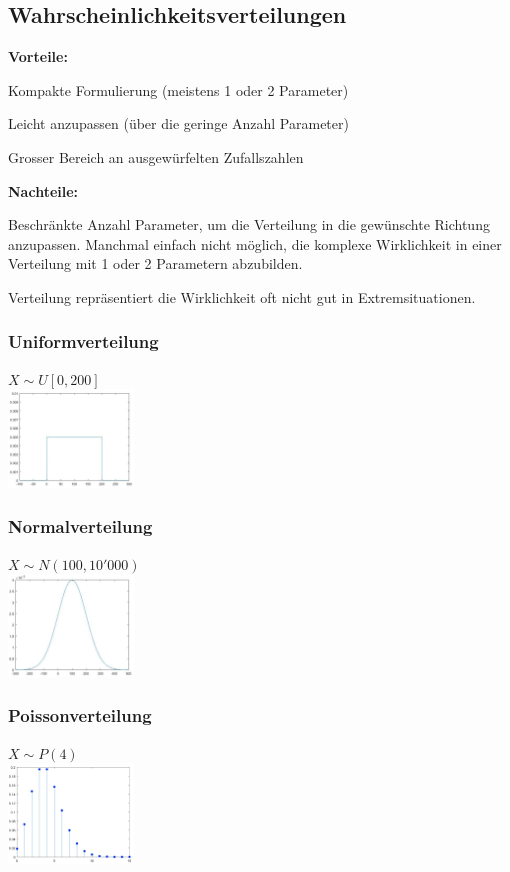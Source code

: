 \subsection{Wahrscheinlichkeitsverteilungen}	
\textbf{Vorteile:} 	
\begin{compactitem}
	\item Kompakte Formulierung (meistens 1 oder 2 Parameter)
	\item Leicht anzupassen (über die geringe Anzahl Parameter)
	\item Grosser Bereich an ausgewürfelten Zufallszahlen
\end{compactitem}	
\textbf{Nachteile:}
\begin{compactitem}
	\item Beschränkte Anzahl Parameter, um die Verteilung in die gewünschte Richtung anzupassen. Manchmal einfach nicht möglich, die komplexe Wirklichkeit in einer Verteilung mit 1 oder 2 Parametern abzubilden.
	\item Verteilung repräsentiert die Wirklichkeit oft nicht gut in Extremsituationen.
\end{compactitem}

\begin{multicols}{3}
	\subsubsection{Uniformverteilung} 
	$X \sim U[0, 200]$ \\
	\includegraphics[width=0.25\textwidth]{pictures/uniformverteilung} 
	\subsubsection{Normalverteilung} 
	$X \sim N(100, 10'000)$ \\
	\includegraphics[width=0.25\textwidth]{pictures/normalverteilung} 
	\subsubsection{Poissonverteilung}
	$X \sim P(4)$ \\
	\includegraphics[width=0.25\textwidth]{pictures/poissonverteilung} 
\end{multicols}

